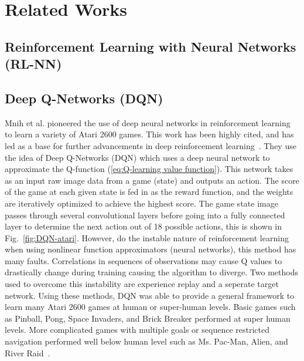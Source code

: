 \documentclass[12pt,american]{report}
\begin{document}
\section{Related Works}

\subsection{Reinforcement Learning with Neural Networks (RL-NN)}

\subsection{Deep Q-Networks (DQN)}

Mnih et al. pioneered the use of deep neural networks in reinforcement learning to learn a variety of Atari 2600 games.  This work has been highly cited, and has led as a base for further advancements in deep reinforcement learning~\cite{atari}.  They use the idea of Deep Q-Networks (DQN) which uses a deep neural network to approximate the Q-function (\ref{eq:Q-learning value function}). This network takes as an input raw image data from a game (state) and outputs an action. The score of the game at each given state is fed in as the reward function, and the weights are iteratively optimized to achieve the highest score. The game state image passes through several convolutional layers before going into a fully connected layer to determine the next action out of 18 possible actions, this is shown in Fig.~\ref{fig:DQN-atari}. However, do the instable nature of reinforcement learning when using nonlinear function approximators (neural networks), this method has many faults. Correlations in sequences of observations may cause Q values to drastically change during training causing the algorithm to diverge. Two methods used to overcome this instability are experience replay and a seperate target network. Using these methods, DQN was able to provide a general framework to learn many Atari 2600 games at human or super-human levels. Basic games such as Pinball, Pong, Space Invaders, and Brick Breaker performed at super human levels. More complicated games with multiple goals or sequence restricted navigation performed well below human level such as Ms. Pac-Man, Alien, and River Raid~\cite{atari}.
\end{document}
